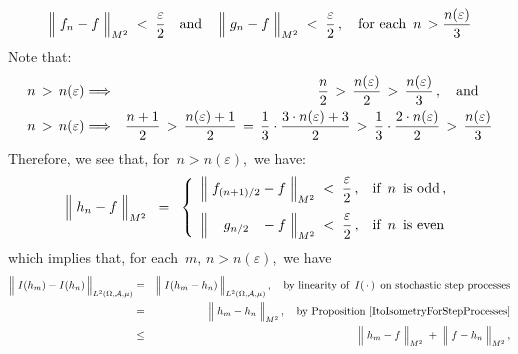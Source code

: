 \begin{enumerate}
\begin{equation*}
	\left\Vert\; f_{n} \overset{{\color{white}.}}{-} f \;\right\Vert_{M^{2}} \; < \; \dfrac{\varepsilon}{2}
	\quad\textnormal{and}\quad
	\left\Vert\; g_{n} \overset{{\color{white}.}}{-} f \;\right\Vert_{M^{2}} \; < \; \dfrac{\varepsilon}{2}\,,
	\quad\textnormal{for each \,$n \,> \dfrac{n(\varepsilon)}{3}$}
	\end{equation*}
	Note that:
	\begin{eqnarray*}
	n \,>\, n(\varepsilon)
	& \Longrightarrow &
		\dfrac{n}{2} \,>\, \dfrac{n(\varepsilon)}{2} \,>\, \dfrac{n(\varepsilon)}{3}\,,
		\quad\textnormal{and}\quad
	\\
	n \,>\, n(\varepsilon)
	& \Longrightarrow &
		\dfrac{n+1}{2}
		\,>\, \dfrac{n(\varepsilon)+1}{2}
		\,=\, \dfrac{1}{3}\cdot\dfrac{3 \cdot n(\varepsilon)+3}{2}
		\,>\, \dfrac{1}{3}\cdot\dfrac{2 \cdot n(\varepsilon)}{2} 
		\,>\, \dfrac{n(\varepsilon)}{3}
	\end{eqnarray*}
	Therefore, we see that, for \,$n > n(\varepsilon)$,\, we have:
	\begin{equation}\label{hMinusFLessThanEpsilon}
	\left\Vert\; h_{n} \overset{{\color{white}.}}{-} f \;\right\Vert_{M^{2}}
	\;\; = \;\;
		\left\{\begin{array}{ll}
		\left\Vert\;
			f_{(n+1)/2} \overset{{\color{white}.}}{-} f
			\;\right\Vert_{M^{2}}
		\;<\; \dfrac{\varepsilon}{2}\,, & \textnormal{if \,$n$\, is odd}\,,
		\\
		\overset{{\color{white}1}}{\left\Vert\;
			{\color{white}...}g_{n/2}{\color{white}...} \overset{{\color{white}.}}{-} f
			\;\right\Vert_{M^{2}}}
		\;<\; \dfrac{\varepsilon}{2}\,, & \textnormal{if \,$n$\, is even}
		\end{array}\right.
	\end{equation}
	which implies that, for each \,$m,\, n > n(\varepsilon)$,\, we have
	\begin{eqnarray*}
	\left\Vert\; I(h_{m}) \overset{{\color{white}.}}{-} I(h_{n}) \,\right\Vert_{L^{2}(\Omega,\mathcal{A},\mu)}
	& = &
		\left\Vert\; I(h_{m} \overset{{\color{white}.}}{-} h_{n}) \,\right\Vert_{L^{2}(\Omega,\mathcal{A},\mu)},
		\quad
		\textnormal{by linearity of \,$I(\,\cdot\,)$\, on stochastic step processes}
	\\
	& = &
		\left\Vert\; h_{m} \overset{{\color{white}.}}{-} h_{n} \;\right\Vert_{M^{2}},
		\quad
		\textnormal{by Proposition \ref{ItoIsometryForStepProcesses}}
	\\
	& \leq &
		\left\Vert\; h_{m} \overset{{\color{white}.}}{-} f \;\right\Vert_{M^{2}}
		\; + \;
		\left\Vert\; f \overset{{\color{white}.}}{-} h_{n} \;\right\Vert_{M^{2}},

\end{eqnarray*}
\end{enumerate}
